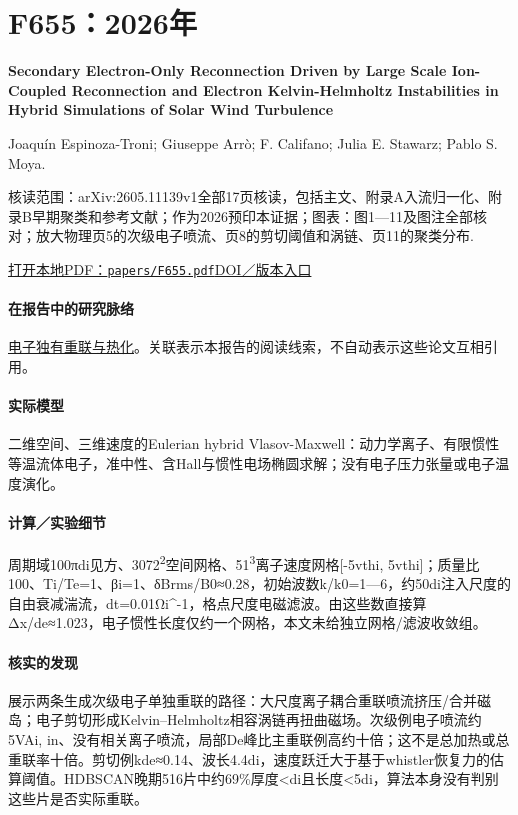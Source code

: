 \section{F655：2026年}\label{paper:F655}

\textbf{Secondary Electron-Only Reconnection Driven by Large Scale Ion-Coupled Reconnection and Electron Kelvin-Helmholtz Instabilities in Hybrid Simulations of Solar Wind Turbulence}\citep{F655}\

Joaquín Espinoza-Troni;  Giuseppe Arrò;  F. Califano;  Julia E. Stawarz;  Pablo S. Moya.

\textsf{核读范围：}arXiv:2605.11139v1全部17页核读，包括主文、附录A入流归一化、附录B早期聚类和参考文献；作为2026预印本证据；\textsf{图表：}图1—11及图注全部核对；放大物理页5的次级电子喷流、页8的剪切阈值和涡链、页11的聚类分布.

\href{run:papers/F655.pdf}{打开本地PDF：\texttt{papers/F655.pdf}}\quad\href{https://doi.org/10.48550/arxiv.2605.11139}{DOI／版本入口}

\paragraph{在报告中的研究脉络}\hyperref[story:energy]{电子独有重联与热化}。关联表示本报告的阅读线索，不自动表示这些论文互相引用。

\paragraph{实际模型}二维空间、三维速度的Eulerian hybrid Vlasov-Maxwell：动力学离子、有限惯性等温流体电子，准中性、含Hall与惯性电场椭圆求解；没有电子压力张量或电子温度演化。

\paragraph{计算／实验细节}周期域100πdi见方、3072\textsuperscript{2}空间网格、51\textsuperscript{3}离子速度网格[-5vthi, 5vthi]；质量比100、Ti/Te=1、βi=1、δBrms/B0≈0.28，初始波数k/k0=1—6，约50di注入尺度的自由衰减湍流，dt=0.01Ωi\textasciicircum{}-1，格点尺度电磁滤波。由这些数直接算Δx/de≈1.023，电子惯性长度仅约一个网格，本文未给独立网格/滤波收敛组。

\paragraph{核实的发现}展示两条生成次级电子单独重联的路径：大尺度离子耦合重联喷流挤压/合并磁岛；电子剪切形成Kelvin–Helmholtz相容涡链再扭曲磁场。次级例电子喷流约5VAi, in、没有相关离子喷流，局部De峰比主重联例高约十倍；这不是总加热或总重联率十倍。剪切例kde≈0.14、波长4.4di，速度跃迁大于基于whistler恢复力的估算阈值。HDBSCAN晚期516片中约69\%厚度<di且长度<5di，算法本身没有判别这些片是否实际重联。

